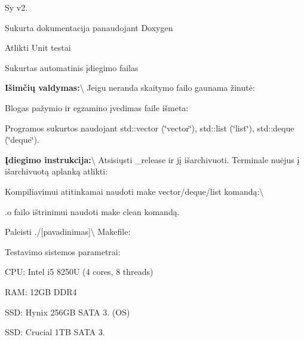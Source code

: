 Sy v2.
\begin{DoxyItemize}
\item Sukurta dokumentacija panaudojant Doxygen
\item Atlikti Unit testai
\item Sukurtas automatinis įdiegimo failas
\end{DoxyItemize}

{\bfseries{Išimčių valdymas\+:}}\textbackslash{} Jeigu neranda skaitymo failo gaunama žinutė\+: 
\begin{DoxyCode}{0}

\end{DoxyCode}
 Blogas pažymio ir egzamino įvedimas faile išmeta\+: 
\begin{DoxyCode}{0}

\end{DoxyCode}
 Programos sukurtos naudojant std\+::vector (\char`\"{}vector\char`\"{}), std\+::list (\char`\"{}list\char`\"{}), std\+::deque (\char`\"{}deque\char`\"{}).

{\bfseries{Įdiegimo instrukcija\+:}}\textbackslash{} Atsisiųsti \+\_\+release ir jį išarchivuoti. Terminale nuėjus į išarchivuotą aplanką atlikti\+:
\begin{DoxyItemize}
\item Kompiliavimui atitinkamai naudoti make vector/deque/list komandą\+:\textbackslash{}
\item .o failo ištrinimui naudoti make clean komandą.
\item Paleisti ./\mbox{[}pavadinimas\mbox{]}\textbackslash{} Makefile\+: 
\begin{DoxyCode}{0}

\end{DoxyCode}

\end{DoxyItemize}

Testavimo sistemos parametrai\+:
\begin{DoxyItemize}
\item CPU\+: Intel i5 8250U (4 cores, 8 threads)
\item RAM\+: 12GB DDR4
\item SSD\+: Hynix 256GB SATA 3. (OS)
\item SSD\+: Crucial 1TB SATA 3. 
\end{DoxyItemize}